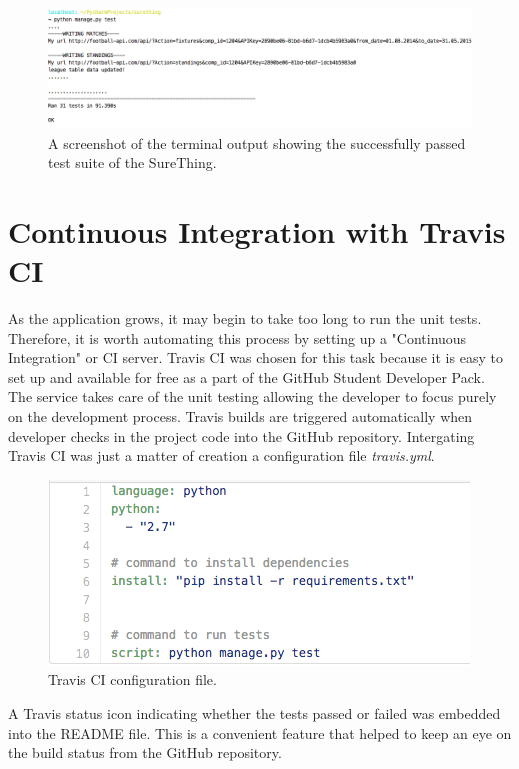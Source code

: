 \begin{figure}[H]
	\begin{center}
		\includegraphics[width=.90\textwidth]{testing/images/unittestsOk}
		\caption{A screenshot of the terminal output showing the successfully passed test suite of the SureThing.}
		\label{fig:using:unitttestsok}
\end{center}
\end{figure}

\section{Continuous Integration with Travis CI}
\label{sec:travis_test}
As the application grows, it may begin to take too long to run the unit tests. Therefore, it is worth automating this process by setting up a "Continuous Integration" or CI server. Travis CI was chosen for this task because it is easy to set up and available for free as a part of the GitHub Student Developer Pack.
The service takes care of the unit testing allowing the developer to focus purely on the development process. Travis builds are triggered automatically when developer checks in the project code into the GitHub repository. Intergating Travis CI was just a matter of creation a configuration file \emph{travis.yml}.

\begin{figure}[H]
	\begin{center}
		\includegraphics[width=.60\textwidth]{testing/images/travisYml}
		\caption{Travis CI configuration file.}
		\label{fig:using:travisyml}
\end{center}
\end{figure}
	
A Travis status icon indicating whether the tests passed or failed was embedded into the README file. This is a convenient feature that helped to keep an eye on the build status from the GitHub repository.

